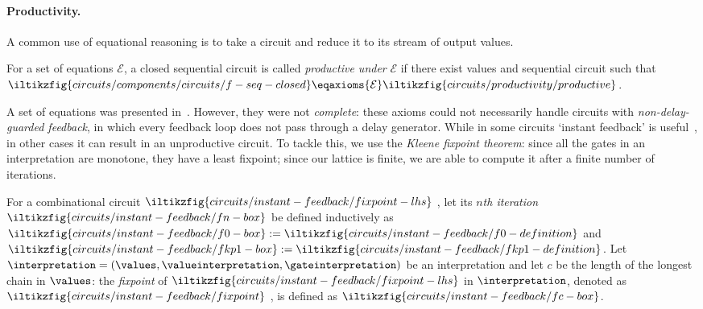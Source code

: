 \documentclass[10pt]{article}
\begin{document}
    \paragraph*{Productivity.}
    A common use of equational reasoning is to take a circuit and reduce it to its stream of output values.

    \begin{definition}[Productivity]
        For a set of equations \(\mathcal{E}\), a closed sequential circuit  is called \emph{productive under} \(\mathcal{E}\) if there exist values  and sequential circuit  such that
        \(
            \iltikzfig{circuits/components/circuits/f-seq-closed} 
            \eqaxioms{\mathcal{E}}
            \iltikzfig{circuits/productivity/productive}
        \).
    \end{definition}

    \noindent
    A set of equations was presented in~\cite{ghica2016categorical}.
    However, they were not \emph{complete}: these axioms could not necessarily handle circuits with \emph{non-delay-guarded feedback}, in which every feedback loop does not pass through a delay generator.
    While in some circuits `instant feedback' is useful~\cite{riedel2004cyclic,mendler2012constructive}, in other cases it can result in an unproductive circuit.
    To tackle this, we use the \emph{Kleene fixpoint theorem}: since all the gates in an interpretation are monotone, they have a least fixpoint; since our lattice is finite, we are able to compute it after a finite number of iterations.

    \begin{definition}
        For a combinational circuit
        \(\iltikzfig{circuits/instant-feedback/fixpoint-lhs}\)
        , let its \emph{\(n\)th iteration} 
        \(\iltikzfig{circuits/instant-feedback/fn-box}\) 
        be defined inductively as
        \(
            \iltikzfig{circuits/instant-feedback/f0-box} 
            := 
            \iltikzfig{circuits/instant-feedback/f0-definition}
        \) 
        and 
        \(
            \iltikzfig{circuits/instant-feedback/fkp1-box} 
            := 
            \iltikzfig{circuits/instant-feedback/fkp1-definition}
        \).
        Let \(\interpretation = (\values,\valueinterpretation,\gateinterpretation)\) be an interpretation and let \(c\) be the length of the longest chain in \(\values\): the \emph{fixpoint} of 
        \(\iltikzfig{circuits/instant-feedback/fixpoint-lhs}\)
        in \(\interpretation\), denoted as 
        \(\iltikzfig{circuits/instant-feedback/fixpoint}\)
        , is defined as \(\iltikzfig{circuits/instant-feedback/fc-box}\).
    \end{definition}
    
\end{document}
